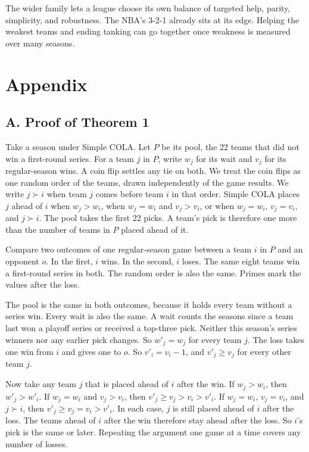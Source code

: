 \documentclass[11pt,letterpaper]{article}
\begin{document}
The wider family lets a league choose its own balance of targeted help, parity, simplicity, and robustness. The NBA's 3-2-1 already sits at its edge. Helping the weakest teams and ending tanking can go together once weakness is measured over many seasons.

\clearpage



\clearpage
\section*{Appendix}

\subsection*{A. Proof of Theorem 1}

Take a season under Simple COLA. Let $P$ be its pool, the 22 teams that did not win a first-round series. For a team $j$ in $P$, write $w_j$ for its wait and $v_j$ for its regular-season wins. A coin flip settles any tie on both. We treat the coin flips as one random order of the teams, drawn independently of the game results. We write $j \succ i$ when team $j$ comes before team $i$ in that order. Simple COLA places $j$ ahead of $i$ when $w_j > w_i$, when $w_j = w_i$ and $v_j > v_i$, or when $w_j = w_i$, $v_j = v_i$, and $j \succ i$. The pool takes the first 22 picks. A team's pick is therefore one more than the number of teams in $P$ placed ahead of it.

Compare two outcomes of one regular-season game between a team $i$ in $P$ and an opponent $o$. In the first, $i$ wins. In the second, $i$ loses. The same eight teams win a first-round series in both. The random order is also the same. Primes mark the values after the loss.

The pool is the same in both outcomes, because it holds every team without a series win. Every wait is also the same. A wait counts the seasons since a team last won a playoff series or received a top-three pick. Neither this season's series winners nor any earlier pick changes. So $w'_j = w_j$ for every team $j$. The loss takes one win from $i$ and gives one to $o$. So $v'_i = v_i - 1$, and $v'_j \ge v_j$ for every other team $j$.

Now take any team $j$ that is placed ahead of $i$ after the win. If $w_j > w_i$, then $w'_j > w'_i$. If $w_j = w_i$ and $v_j > v_i$, then $v'_j \ge v_j > v_i > v'_i$. If $w_j = w_i$, $v_j = v_i$, and $j \succ i$, then $v'_j \ge v_j = v_i > v'_i$. In each case, $j$ is still placed ahead of $i$ after the loss. The teams ahead of $i$ after the win therefore stay ahead after the loss. So $i$'s pick is the same or later. Repeating the argument one game at a time covers any number of losses.
\end{document}
